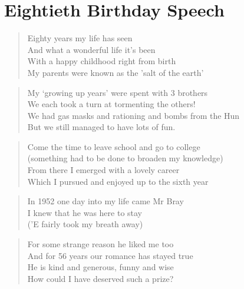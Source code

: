 \chapter{Eightieth Birthday Speech}
\label{birthday}

\begin{verse}
Eighty years my life has seen \\
And what a wonderful life it's been \\
With a happy childhood right from birth \\
My parents were known as the 'salt of the earth' \\
\end{verse}

\begin{verse}
My `growing up years' were spent with 3 brothers \\
We each took a turn at tormenting the others! \\
We had gas masks and rationing and bombs from the Hun \\
But we still managed to have lots of fun. \\
\end{verse}

\begin{verse}
Come the time to leave school and go to college \\
(something had to be done to broaden my knowledge) \\
From there I emerged with a lovely career \\
Which I pursued and enjoyed up to the sixth year \\
\end{verse}

\begin{verse}
In 1952 one day into my life came Mr Bray \\
I knew that he was here to stay \\
('E fairly took my breath away) \\
\end{verse}

\begin{verse}
For some strange reason he liked me too \\
And for 56 years our romance has stayed true \\
He is kind and generous, funny and wise \\
How could I have deserved such a prize? \\
\end{verse}

